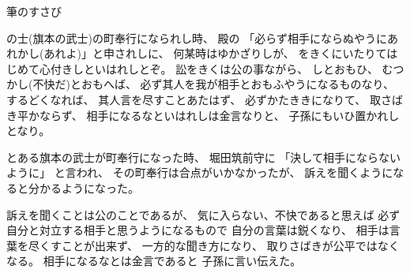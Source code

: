 \documentclass[10pt,b5paper]{ltjsarticle}
\begin{document}
筆のすさび

\hrulefill

の士(旗本の武士)の町奉行になられし時、
殿の
「必らず相手にならぬやうにあれかし(あれよ)」と申されしに、
何某時はゆかざりしが、
をきくにいたりてはじめて心付きしといはれしとぞ。
訟をきくは公の事ながら、
しとおもひ、
むつかし(不快だ)とおもへば、
必ず其人を我が相手とおもふやうになるものなり、
するどくなれば、
其人言を尽すことあたはず、
必ずかたききになりて、
取さばき平かならず、
相手になるなといはれしは金言なりと、
子孫にもいひ置かれしとなり。


\dotfill

とある旗本の武士が町奉行になった時、
堀田筑前守に
「決して相手にならないように」
と言われ、
その町奉行は合点がいかなかったが、
訴えを聞くようになると分かるようになった。

訴えを聞くことは公のことであるが、
気に入らない、不快であると思えば
必ず自分と対立する相手と思うようになるもので
自分の言葉は鋭くなり、
相手は言葉を尽くすことが出来ず、
一方的な聞き方になり、
取りさばきが公平ではなくなる。
相手になるなとは金言であると
子孫に言い伝えた。


\hrulefill
\end{document}
